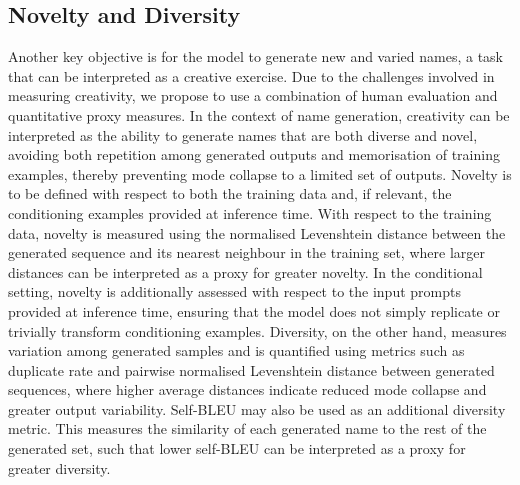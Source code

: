 \documentclass[Main.tex]{subfiles}
\begin{document}
\subsection{Novelty and Diversity}
Another key objective is for the model to generate new and varied names, a task that can be interpreted as a creative exercise. Due to the challenges involved in measuring creativity, we propose to use a combination of human evaluation and quantitative proxy measures. In the context of name generation, creativity can be interpreted as the ability to generate names that are both diverse and novel, avoiding both repetition among generated outputs and memorisation of training examples, thereby preventing mode collapse to a limited set of outputs. Novelty is to be defined with respect to both the training data and, if relevant, the conditioning examples provided at inference time. With respect to the training data, novelty is measured using the normalised Levenshtein distance between the generated sequence and its nearest neighbour in the training set, where larger distances can be interpreted as a proxy for greater novelty. In the conditional setting, novelty is additionally assessed with respect to the input prompts provided at inference time, ensuring that the model does not simply replicate or trivially transform conditioning examples. Diversity, on the other hand, measures variation among generated samples and is quantified using metrics such as duplicate rate and pairwise normalised Levenshtein distance between generated sequences, where higher average distances indicate reduced mode collapse and greater output variability. Self-BLEU \cite{zhu_texygen_2018} may also be used as an additional diversity metric. This measures the similarity of each generated name to the rest of the generated set, such that lower self-BLEU can be interpreted as a proxy for greater diversity.\\
\end{document}
